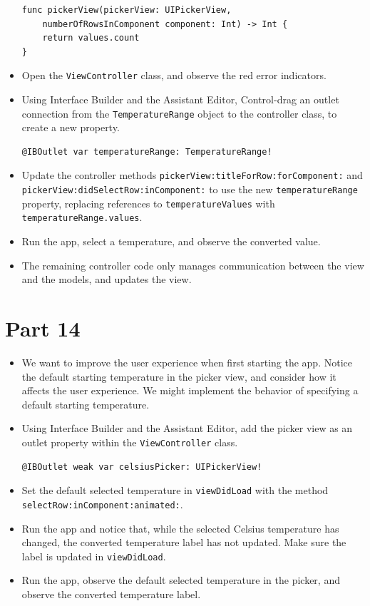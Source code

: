 \documentclass[a4paper,11pt]{scrartcl}
\begin{document}
\begin{itemize}
\begin{lstlisting}
func pickerView(pickerView: UIPickerView,
	numberOfRowsInComponent component: Int) -> Int {
	return values.count
}
\end{lstlisting}
\item Open the \texttt{ViewController} class, and observe the red error indicators.
\item Using Interface Builder and the Assistant Editor, Control-drag an outlet connection from the \texttt{TemperatureRange} object to the controller class, to create a new property.
\begin{lstlisting}
@IBOutlet var temperatureRange: TemperatureRange!
\end{lstlisting}
\item Update the controller methods \texttt{pickerView:titleForRow:forComponent:} and \\\texttt{pickerView:didSelectRow:inComponent:} to use the new \texttt{temperatureRange} property, replacing references to \texttt{temperatureValues} with \texttt{temperatureRange.values}.
\item Run the app, select a temperature, and observe the converted value.
\item The remaining controller code only manages communication between the view and the models, and updates the view.
\end{itemize}

\section*{Part 14}

\begin{itemize}
\item We want to improve the user experience when first starting the app. Notice the default starting temperature in the picker view, and consider how it affects the user experience. We might implement the behavior of specifying a default starting temperature.
\item Using Interface Builder and the Assistant Editor, add the picker view as an outlet property within the \texttt{ViewController} class.
\begin{lstlisting}
@IBOutlet weak var celsiusPicker: UIPickerView!
\end{lstlisting}
\item Set the default selected temperature in \texttt{viewDidLoad} with the method \\\texttt{selectRow:inComponent:animated:}.
\item Run the app and notice that, while the selected Celsius temperature has changed, the converted temperature label has not updated. Make sure the label is updated in \texttt{viewDidLoad}.
\item Run the app, observe the default selected temperature in the picker, and observe the converted temperature label.
\end{itemize}
\end{document}
